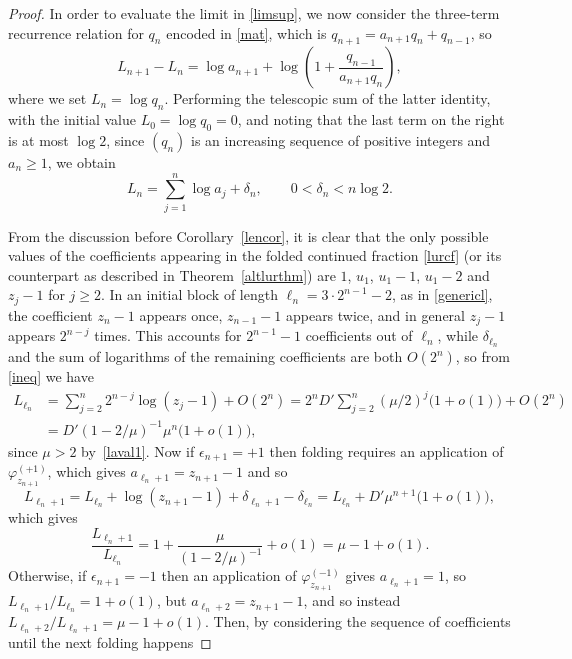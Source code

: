 \documentclass[12pt,a4paper]{amsart}
\theoremstyle{definition}
\numberwithin{equation}{section}
\newcommand\eps{{\epsilon}}
\begin{document}
\begin{proof}
In order to evaluate the limit in \eqref{limsup}, we now consider the three-term recurrence relation for $q_n$ 
encoded in \eqref{mat}, which is $q_{n+1} = a_{n+1}q_n +q_{n-1}$, so
\[ 
L_{n+1}-L_n = \log a_{n+1}+\log\left(1+\frac{q_{n-1}}{a_{n+1}q_n}\right), 
\] 
where we set $L_n=\log q_n$. 
Performing the telescopic sum of the latter identity, with the initial value 
$L_0 = \log q_0 =0$, and noting that the last term on the right is at most $\log 2$, 
since $(q_n)$ is an increasing sequence of positive integers and $a_n\geq 1$, 
we obtain 
\begin{equation}
\label{ineq} 
L_n=\sum_{j=1}^n\log a_{j}+\delta_n, \qquad 0<\delta_n<n \log 2. 
\end{equation} 

From the discussion before Corollary~\ref{lencor}, it is clear that the only possible values of 
the coefficients appearing in the folded continued fraction \eqref{lurcf} (or its counterpart as 
described in Theorem~\ref{altlurthm}) are $1$, $u_1$, $u_1-1$, $u_1-2$ and $z_j-1$ for $j\geq 2$.
In an initial block of length $\ell_n=3\cdot 2^{n-1}-2$, as in \eqref{genericl}, the coefficient 
$z_n-1$ appears once, $z_{n-1}-1$ appears twice, and in general $z_j-1$ appears $2^{n-j}$ times. 
This accounts for $2^{n-1}-1$ coefficients out of $\ell_n$, while $\delta_{\ell_n}$ and the 
sum of logarithms of the remaining coefficients are both $O(2^n)$, so 
from \eqref{ineq} we have 
\begin{align*}
L_{\ell_n} & = \sum_{j=2}^n 2^{n-j} \log (z_j-1)+O(2^n) 
= 2^n D' \sum_{j=2}^n (\mu/2)^j \big(1+o(1)\big) + O(2^n) \\
& = D' (1-2/\mu)^{-1} \mu^n \big(1+o(1)\big),
\end{align*}
since $\mu>2$ by~\eqref{laval1}. 
Now if $\eps_{n+1} = +1$ then folding requires an application of $\varphi^{(+1)}_{z_{n+1}}$, 
which gives $a_{\ell_{n}+1} = z_{n+1}-1$ and so 
\[ 
L_{\ell_{n}+1} = L_{\ell_n}+\log(z_{n+1}-1)+\delta_{\ell_n+1}-\delta_{\ell_n} = L_{\ell_n}+D'\mu^{n+1}\big(1+o(1)\big), 
\] 
which gives 
\begin{equation}
\label{biggest} 
\frac{L_{\ell_{n}+1}}{L_{\ell_n}} = 1+\frac{\mu}{(1-2/\mu)^{-1}}+o(1) = \mu-1+o(1). 
\end{equation} 
Otherwise, if 
$\eps_{n+1} = -1$ then an application of $\varphi^{(-1)}_{z_{n+1}}$ 
gives $a_{\ell_{n}+1} = 1$, so 
${L_{\ell_{n}+1}}/{L_{\ell_n}} = 1+o(1)$, but $a_{\ell_n+2} = z_{n+1}-1$, and so 
instead ${L_{\ell_{n}+2}}/{L_{\ell_n+1}} = \mu-1+o(1)$. 
Then, by considering the sequence of coefficients until the next folding happens 

\end{proof}
\end{document}

